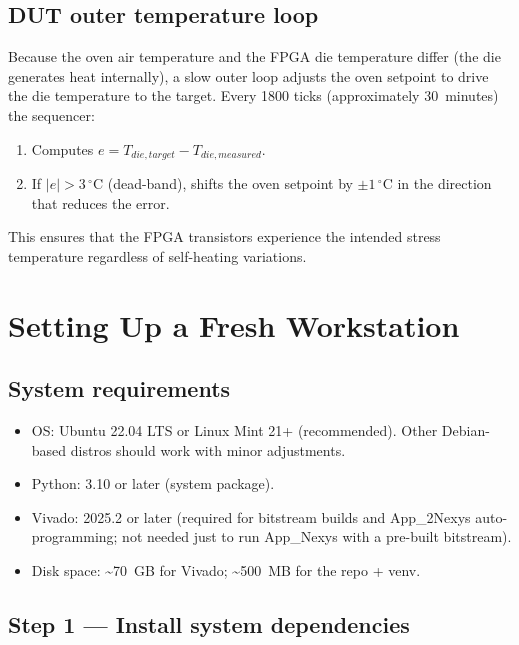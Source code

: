 \documentclass[12pt, a4paper]{report}
\begin{document}
\section{DUT outer temperature loop}

Because the oven air temperature and the FPGA die temperature differ (the die generates
heat internally), a slow outer loop adjusts the oven setpoint to drive the die temperature
to the target. Every 1800 ticks (approximately 30~minutes) the sequencer:

\begin{enumerate}
  \item Computes $e = T_{die,target} - T_{die,measured}$.
  \item If $|e| > 3\,^\circ\text{C}$ (dead-band), shifts the oven setpoint by $\pm 1\,^\circ\text{C}$
        in the direction that reduces the error.
\end{enumerate}

This ensures that the FPGA transistors experience the intended stress temperature
regardless of self-heating variations.

\chapter{Setting Up a Fresh Workstation}
\label{ch:setup}

\section{System requirements}

\begin{itemize}
  \item OS: Ubuntu 22.04 LTS or Linux Mint 21+ (recommended). Other Debian-based
        distros should work with minor adjustments.
  \item Python: 3.10 or later (system package).
  \item Vivado: 2025.2 or later (required for bitstream builds and App\_2Nexys
        auto-programming; not needed just to run App\_Nexys with a pre-built bitstream).
  \item Disk space: \textasciitilde{}70~GB for Vivado; \textasciitilde{}500~MB for the repo + venv.
\end{itemize}

\section{Step 1 --- Install system dependencies}
\end{document}
